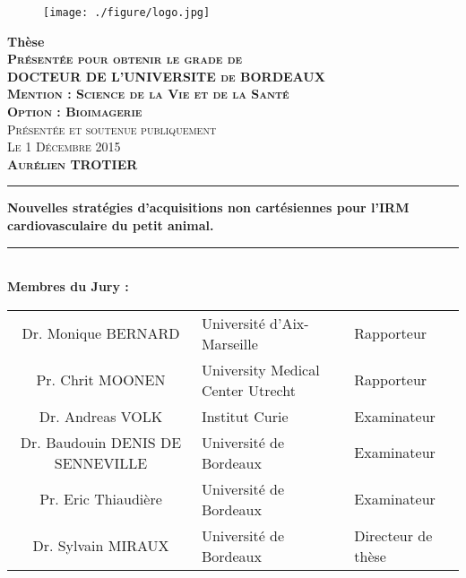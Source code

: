 
  
\begin{titlepage}
\thispagestyle{empty}
   \begin{figure}[H]
	\texttt{[image: ./figure/logo.jpg]}
\end{figure} 
	\begin{center}
   		\huge\textbf{Thèse}\\
   		\vspace{0.5em}
   		\small\scshape\textbf{Présentée pour obtenir le grade de}\\
   		\vspace{0.5em}
   		\large\textbf{DOCTEUR DE L'UNIVERSITE de BORDEAUX}\\
   		\vspace{2em}
   		\small\textbf{Mention : Science de la Vie et de la Santé}\\
   		\small\textbf{Option : Bioimagerie}\\
   		\vspace{2em}
   		Présentée et soutenue publiquement\\
   		\small{Le 1 Décembre 2015}\\
   		\vspace{0.5em}
   		\Large\textbf{ Aurélien TROTIER}\\
   		\vspace{2em}

   		\rule{\linewidth}{2pt}
   		\Large\textbf{Nouvelles stratégies d'acquisitions non cartésiennes pour l'IRM cardiovasculaire du petit animal.}\\
   		\rule{\linewidth}{2pt}
   		\vspace{1em}\\
   		\normalsize\textbf{Membres du Jury : }\\
   	\end{center}

\begin{table}[!ht]
\small\centering
{}
\renewcommand\tabularxcolumn[1]{>{\centering}m{#1}}
	\begin{tabularx}{\textwidth}{c n d}
	Dr. Monique BERNARD & Université d'Aix-Marseille & Rapporteur \\
	Pr. Chrit MOONEN &  University Medical Center Utrecht & Rapporteur \\
	Dr. Andreas VOLK & Institut Curie & Examinateur\\
	Dr. Baudouin DENIS DE SENNEVILLE & Université de Bordeaux & Examinateur\\
	Pr. Eric Thiaudière & Université de Bordeaux & Examinateur\\
	Dr. Sylvain MIRAUX & Université de Bordeaux & Directeur de thèse\\
	\end{tabularx}
\end{table}


\end{titlepage}
